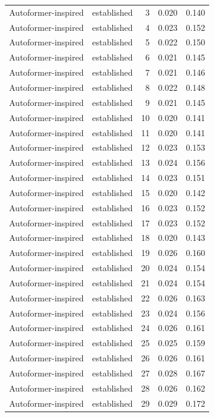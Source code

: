\begin{tabular}{llrrr}
Autoformer-inspired & established & 3 & 0.020 & 0.140 \\
Autoformer-inspired & established & 4 & 0.023 & 0.152 \\
Autoformer-inspired & established & 5 & 0.022 & 0.150 \\
Autoformer-inspired & established & 6 & 0.021 & 0.145 \\
Autoformer-inspired & established & 7 & 0.021 & 0.146 \\
Autoformer-inspired & established & 8 & 0.022 & 0.148 \\
Autoformer-inspired & established & 9 & 0.021 & 0.145 \\
Autoformer-inspired & established & 10 & 0.020 & 0.141 \\
Autoformer-inspired & established & 11 & 0.020 & 0.141 \\
Autoformer-inspired & established & 12 & 0.023 & 0.153 \\
Autoformer-inspired & established & 13 & 0.024 & 0.156 \\
Autoformer-inspired & established & 14 & 0.023 & 0.151 \\
Autoformer-inspired & established & 15 & 0.020 & 0.142 \\
Autoformer-inspired & established & 16 & 0.023 & 0.152 \\
Autoformer-inspired & established & 17 & 0.023 & 0.152 \\
Autoformer-inspired & established & 18 & 0.020 & 0.143 \\
Autoformer-inspired & established & 19 & 0.026 & 0.160 \\
Autoformer-inspired & established & 20 & 0.024 & 0.154 \\
Autoformer-inspired & established & 21 & 0.024 & 0.154 \\
Autoformer-inspired & established & 22 & 0.026 & 0.163 \\
Autoformer-inspired & established & 23 & 0.024 & 0.156 \\
Autoformer-inspired & established & 24 & 0.026 & 0.161 \\
Autoformer-inspired & established & 25 & 0.025 & 0.159 \\
Autoformer-inspired & established & 26 & 0.026 & 0.161 \\
Autoformer-inspired & established & 27 & 0.028 & 0.167 \\
Autoformer-inspired & established & 28 & 0.026 & 0.162 \\
Autoformer-inspired & established & 29 & 0.029 & 0.172 \\

\end{tabular}
